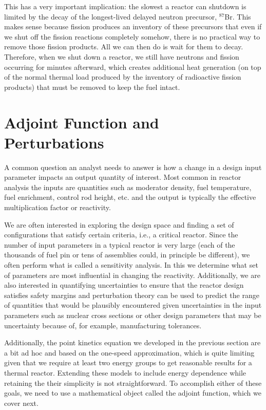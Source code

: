 This has a very important implication: the slowest a reactor can shutdown is limited by the decay of the longest-lived delayed neutron precursor, $^{87}$Br. This makes sense because fission produces an inventory of these precursors that even if we shut off the fission reactions completely somehow, there is no practical way to remove those fission products. All we can then do is wait for them to decay. Therefore, when we shut down a reactor, we still have neutrons and fission occurring for minutes afterward, which creates additional heat generation (on top of the normal thermal load produced by the inventory of radioactive fission products) that must be removed to keep the fuel intact.

\section{Adjoint Function and Perturbations}

A common question an analyst needs to answer is how a change in a design input parameter impacts an output quantity of interest. Most common in reactor analysis the inputs are quantities such as moderator density, fuel temperature, fuel enrichment, control rod height, etc. and the output is typically the effective multiplication factor or reactivity. 

We are often interested in exploring the design space and finding a set of configurations that satisfy certain criteria, i.e., a critical reactor. Since the number of input parameters in a typical reactor is very large (each of the thousands of fuel pin or tens of assemblies could, in principle be different), we often perform what is called a sensitivity analysis. In this we determine what set of parameters are most influential in changing the reactivity. Additionally, we are also interested in quantifying uncertainties to ensure that the reactor design satisfies safety margins and perturbation theory can be used to predict the range of quantities that would be plausibly encountered given uncertainties in the input parameters such as nuclear cross sections or other design parameters that may be uncertainty because of, for example, manufacturing tolerances.

Additionally, the point kinetics equation we developed in the previous section are a bit ad hoc and based on the one-speed approximation, which is quite limiting given that we require at least two energy groups to get reasonable results for a thermal reactor. Extending these models to include energy dependence while retaining the their simplicity is not straightforward. To accomplish either of these goals, we need to use a mathematical object called the adjoint function, which we cover next.

